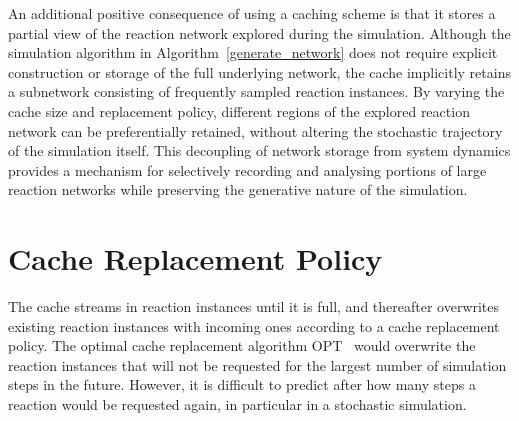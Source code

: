An additional positive consequence of using a caching scheme is that it stores a partial view of the reaction network explored during the simulation. Although the simulation algorithm in Algorithm~\ref{generate_network} does not require explicit construction or storage of the full underlying network, the cache implicitly retains a subnetwork consisting of frequently sampled reaction instances. By varying the cache size and replacement policy, different regions of the explored reaction network can be preferentially retained, without altering the stochastic trajectory of the simulation itself. This decoupling of network storage from system dynamics provides a mechanism for selectively recording and analysing portions of large reaction networks while preserving the generative nature of the simulation.

\section{Cache Replacement Policy}
\label{crp}

The cache streams in reaction instances until it is full, and thereafter overwrites existing reaction instances with incoming ones according to a cache replacement policy. The optimal cache replacement algorithm OPT~\cite{cache_opt} would overwrite the reaction instances that will not be requested for the largest number of simulation steps in the future. However, it is difficult to predict after how many steps a reaction would be requested again, in particular in a stochastic simulation.

